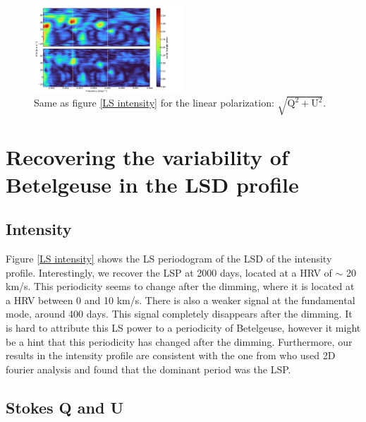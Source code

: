 \documentclass{aa}
\begin{document}
\begin{figure}[!h]
    \centering
    \includegraphics[width=0.5\textwidth]{Lomb-Scargle linear polarization.png}
    \caption{Same as figure \ref{LS intensity} for the linear polarization: $\sqrt{\mathrm{Q^2}+\mathrm{U^2}}$.}
    \label{LS linear polarization}
\end{figure}



\section{Recovering the variability of Betelgeuse in the LSD profile}

\subsection{Intensity}
Figure \ref{LS intensity} shows the LS periodogram of the LSD of the intensity profile. Interestingly, we recover the LSP at 2000 days, 
located at a HRV of $\sim$ 20 km/s. This periodicity seems to change after the dimming, where it is located at a HRV between 0 and 10 km/s. 
There is also a weaker signal at the fundamental mode, around 400 days. This signal completely disappears after the dimming. It is hard to attribute 
this LS power to a periodicity of Betelgeuse, however it might be a hint that this periodicity has changed after the dimming. Furthermore, our results 
in the intensity profile are consistent with the one from \cite{mathias_evolution_2018} who used 2D fourier analysis and found that the dominant period was the LSP. 


\subsection{Stokes Q and U}
\end{document}
